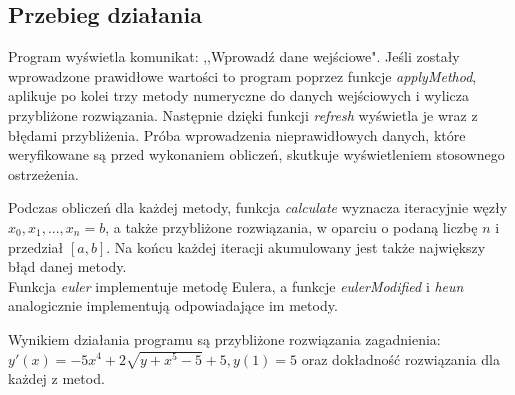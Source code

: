 \documentclass[12pt]{article}
\begin{document}
\subsection{Przebieg działania}
Program wyświetla komunikat: ,,Wprowadź dane wejściowe". Jeśli zostały wprowadzone prawidłowe wartości to program poprzez funkcje \emph{applyMethod}, aplikuje po kolei trzy metody numeryczne do danych wejściowych i wylicza przybliżone rozwiązania. Następnie dzięki funkcji \emph{refresh} wyświetla je wraz z błędami przybliżenia.
Próba wprowadzenia nieprawidłowych danych, które weryfikowane są przed wykonaniem obliczeń, skutkuje wyświetleniem stosownego ostrzeżenia.
\par Podczas obliczeń dla każdej metody, funkcja \emph{calculate} wyznacza iteracyjnie węzły $x_0, x_1, ... , x_n = b$, a także przybliżone rozwiązania, w oparciu o podaną liczbę $n$ i przedział $[a, b]$. Na końcu każdej iteracji akumulowany jest także największy błąd danej metody.
\\
Funkcja \emph{euler} implementuje metodę Eulera, a funkcje \emph{eulerModified} i \emph{heun} analogicznie implementują odpowiadające im metody.



Wynikiem działania programu są przybliżone rozwiązania zagadnienia: $y'(x)= -5x^4+2 \sqrt{y+x^5-5}+5, y(1)=5$  oraz dokładność rozwiązania dla każdej z metod.
\newpage
\end{document}
